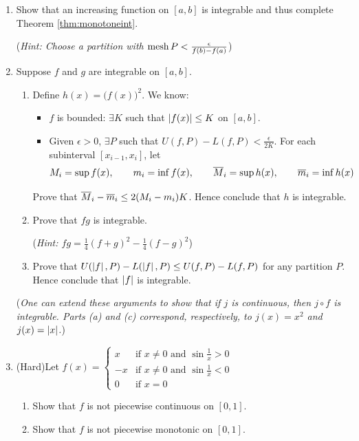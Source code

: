 \begin{exercises}
\begin{enumerate}
	  
	  \item Show that an increasing function on $[a,b]$ is integrable and thus complete Theorem \ref{thm:monotoneint}.\par
	  (\emph{Hint: Choose a partition with $\operatorname{mesh} P<\frac\epsilon{f(b)-f(a)}$})
	 
	  
	  \item Suppose $f$ and $g$ are integrable on $[a,b]$.
		\begin{enumerate}
	    \item Define $h(x)=\bigl(f(x)\bigr)^2$. We know:
	  	\begin{itemize}
	    	\item $f$ is bounded: $\exists K$ such that $\left| f(x)\right|\le K$ on $[a,b]$.
	    	\item Given $\epsilon>0$, $\exists P$ such that $U(f,P)-L(f,P)<\frac\epsilon{2K}$.
	  		For each subinterval $[x_{i-1},x_i]$, let
	  		\[
	  			M_i=\sup f(x),\qquad m_i=\inf f(x),\qquad 
	  			\overline{M}_i=\sup h(x),\qquad \overline{m}_i=\inf h(x)
	  		\]
	  	\end{itemize}
	  	Prove that $\overline{M}_i-\overline{m}_i\le 2(M_i-m_i)K$. Hence conclude that $h$ is integrable.
	  	
	  	\item Prove that $fg$ is integrable.\par
	  	(\emph{Hint: $fg=\frac 14(f+g)^2-\frac 14(f-g)^2$})
	  	
	  	\item Prove that $U(\left| f\right|,P)-L(\left| f\right|,P)\le U(f,P)-L(f,P)$ for any partition $P$. Hence conclude that $\left| f\right|$ is integrable.
	  \end{enumerate}

	  (\emph{One can extend these arguments to show that if $j$ is continuous, then $j\circ f$ is integrable. Parts (a) and (c) correspond, respectively, to $j(x)=x^2$ and $j(x)=\left| x\right|$.})
	  
	  
	  \item (Hard)\quad Let $f(x)=
	  \begin{cases}
	  	x&\text{if }x\neq 0\text{ and }\sin\frac 1x>0\\
	  	-x&\text{if }x\neq 0\text{ and }\sin\frac 1x<0\\
	  	0&\text{if }x=0 
	  \end{cases}$
	  \begin{enumerate}
	  	\item Show that $f$ is not piecewise continuous on $[0,1]$.
	  	
	    \item Show that $f$ is not piecewise monotonic on $[0,1]$.
	    

\end{enumerate}
\end{enumerate}
\end{exercises}
